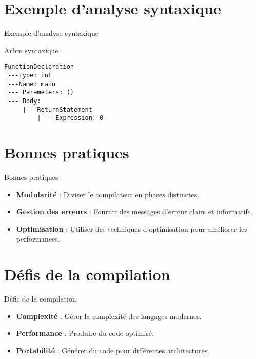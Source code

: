 \documentclass{clbeamer2024}
\begin{document}
	
	\section{Exemple d'analyse syntaxique}
	\begin{frame}[fragile]{Exemple d'analyse syntaxique}
		\begin{exampleblock}{Arbre syntaxique}
			\begin{verbatim}
FunctionDeclaration
|---Type: int
|---Name: main
|--- Parameters: ()
|--- Body:
     |---ReturnStatement
         |--- Expression: 0
			\end{verbatim}
		\end{exampleblock}
	\end{frame}
	
	\section{Bonnes pratiques}
	\begin{frame}{Bonnes pratiques}
		\begin{itemize}
			\item \textbf{Modularité} : Diviser le compilateur en phases distinctes.
			\item \textbf{Gestion des erreurs} : Fournir des messages d'erreur clairs et informatifs.
			\item \textbf{Optimisation} : Utiliser des techniques d'optimisation pour améliorer les performances.
		\end{itemize}
	\end{frame}
	
	\section{Défis de la compilation}
	\begin{frame}{Défis de la compilation}
		\begin{itemize}
			\item \textbf{Complexité} : Gérer la complexité des langages modernes.
			\item \textbf{Performance} : Produire du code optimisé.
			\item \textbf{Portabilité} : Générer du code pour différentes architectures.
		\end{itemize}
	\end{frame}
	
\end{document}
